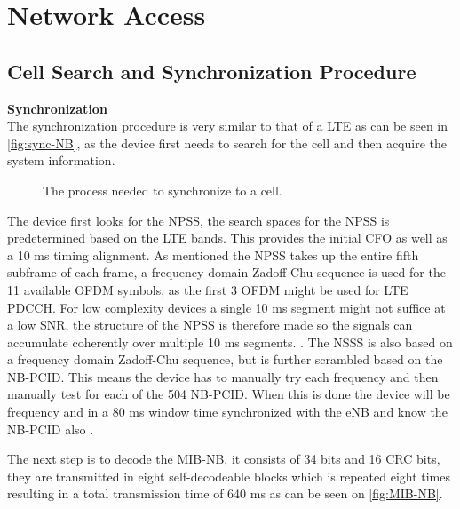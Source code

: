 




\section{Network Access}

\subsection{Cell Search and Synchronization Procedure}


\textbf{Synchronization} \\
The synchronization procedure is very similar to that of a \gls{LTE} as can be seen in \autoref{fig:sync-NB}, as the device first needs to search for the cell and then acquire the system information. 


\begin{figure}[H]
\centering

\caption{The process needed to synchronize to a cell.}
\label{fig:sync-NB}
\end{figure}

The device first looks for the \gls{NPSS}, the search spaces for the \gls{NPSS} is predetermined based on the LTE bands.  This provides the initial \gls{CFO} as well as a 10 ms timing alignment. As mentioned the NPSS takes up the entire fifth subframe of each frame, a frequency domain Zadoff-Chu sequence is used for the 11 available \gls{OFDM} symbols, as the first 3 OFDM might be used for LTE PDCCH. For low complexity devices a single 10 ms segment might not suffice at a low \gls{SNR}, the structure of the \gls{NPSS} is therefore made so the signals can accumulate coherently over multiple 10 ms segments. \citep{NB-IoT_Book,primer}. The \gls{NSSS} is also based on a frequency domain Zadoff-Chu sequence, but is further scrambled based on the \gls{NB-PCID}. This means the device has to manually try each frequency and then manually test for each of the 504 NB-PCID. When this is done the device will be frequency and in a 80 ms window time synchronized with the eNB and know the NB-PCID also \citep{NB-IoT_Book,primer}. 

The next step is to decode the \gls{MIB-NB}, it consists of 34 bits and 16 \gls{CRC} bits, they are transmitted in eight self-decodeable blocks which is repeated eight times resulting in a total transmission time of 640 ms as can be seen on \autoref{fig:MIB-NB}. 
 
